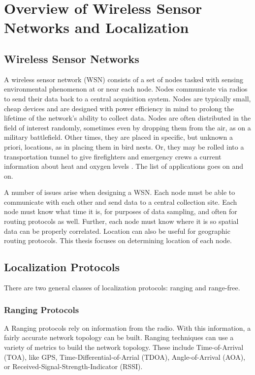 \chapter{Overview of Wireless Sensor Networks and Localization}
\section{Wireless Sensor Networks}

A wireless sensor network (WSN) consists of a set of nodes tasked with sensing environmental phenomenon at or near each node.  Nodes communicate via radios to send their data back to a central acquisition system.  Nodes are typically small, cheap devices and are designed with power efficiency in mind to prolong the lifetime of the network's ability to collect data.  Nodes are often distributed in the field of interest randomly, sometimes even by dropping them from the air, as on a military battlefield.  Other times, they are placed in specific, but unknown a priori, locations, as in placing them in bird nests\cite{birds}.  Or, they may be rolled into a transportation tunnel to give firefighters and emergency crews a current information about heat and oxygen levels \cite{runes}.  The list of applications goes on and on.

A number of issues arise when designing a WSN.  Each node must be able to communicate with each other and send data to a central collection site.  Each node must know what time it is, for purposes of data sampling, and often for routing protocols as well.  Further, each node must know where it is so spatial data can be properly correlated.  Location can also be useful for geographic routing protocols.  This thesis focuses on determining location of each node.

\section{Localization Protocols}

There are two general classes of localization protocols: ranging and range-free.  

\subsection{Ranging Protocols}A
Ranging protocols rely on information from the radio. With this information, a fairly accurate network topology can be built.  Ranging techniques can use a variety of metrics to build the network topology.  These include Time-of-Arrival (TOA), like GPS\cite{Wellenhoff},  Time-Differential-of-Arrial (TDOA)\cite{Savvides}, Angle-of-Arrival (AOA)\cite{Niculescu}, or Received-Signal-Strength-Indicator (RSSI)\cite{Patwari}.  

